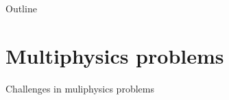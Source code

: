 \documentclass[aspectratio=169]{beamer}
\begin{document}
	
	
	\begin{frame}[plain]
		
		
		
	\end{frame}
	
	
	\begin{frame}{Outline}
		
		\tableofcontents
		
	\end{frame}

\section{Multiphysics problems}


\begin{frame}{Challenges in muliphysics problems}
	

\end{frame}
\end{document}
